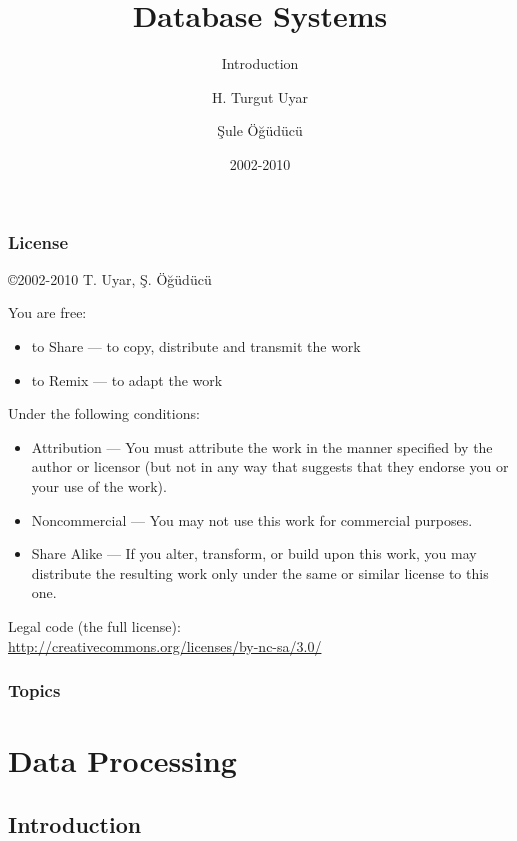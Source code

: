 \documentclass[dvipsnames]{beamer}
\title{Database Systems}
\subtitle{Introduction}
\author{H. Turgut Uyar \and Şule Öğüdücü}
\date{2002-2010}
\theoremstyle{plain}
\begin{document}
\begin{frame}
  \titlepage
\end{frame}

\begin{frame}
  \frametitle{License}

  \hfill
  \copyright 2002-2010 T. Uyar, Ş. Öğüdücü

  \vfill
  \begin{tiny}
    You are free:
    \begin{itemize}
      \item to Share — to copy, distribute and transmit the work
      \item to Remix — to adapt the work
    \end{itemize}

    Under the following conditions:
    \begin{itemize}
      \item Attribution — You must attribute the work in the manner specified by
        the author or licensor (but not in any way that suggests that they
        endorse you or your use of the work).

      \item Noncommercial — You may not use this work for commercial purposes.

      \item Share Alike — If you alter, transform, or build upon this work, you
        may distribute the resulting work only under the same or similar license
        to this one.
    \end{itemize}
  \end{tiny}

  \vfill
  Legal code (the full license):\\
  \url{http://creativecommons.org/licenses/by-nc-sa/3.0/}
\end{frame}

\begin{frame}
  \frametitle{Topics}
  \tableofcontents
\end{frame}

\section{Data Processing}

\subsection{Introduction}
\end{document}
